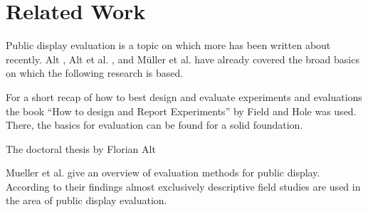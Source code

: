 \section{Related Work}
\label{sec:related-work}

	Public display evaluation is a topic on which more has been written about recently. 
	Alt \cite{alt2013thesis}, Alt et al. \cite{Alt2012HowToEvaluate}, and M{\"u}ller et al. \cite{muller2014mirrortouch} have already covered the broad basics on which the following research is based.

	For a short recap of how to best design and evaluate experiments and evaluations the book ``How to design and Report Experiments'' by Field and Hole \cite{field2003design} was used. There, the basics for evaluation can be found for a solid foundation.





	The doctoral thesis by Florian Alt \cite{}

	Mueller et al. \cite{muller2014mirrortouch} give an overview of evaluation methods for public display. According to their findings almost exclusively descriptive field studies are used in the area of public display evaluation.













